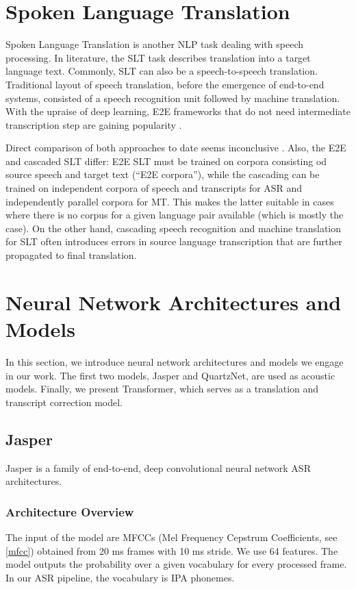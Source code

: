 \pagebreak
\section{Spoken Language Translation}
Spoken Language Translation is another NLP task dealing with speech processing. In literature, the SLT task describes translation into a target language text. Commonly, SLT can also be a speech-to-speech translation. Traditional layout of speech translation, before the emergence of end-to-end systems, consisted of a speech recognition unit followed by machine translation. With the upraise of deep learning, E2E frameworks that do not need intermediate transcription step are gaining popularity .

Direct comparison of both approaches to date seems inconclusive . Also, the E2E and cascaded SLT differ: E2E SLT must be trained on corpora consisting od source speech and target text (``E2E corpora''), while the cascading can be trained on independent corpora of speech and transcripts for ASR and independently parallel corpora for MT. This makes the latter suitable in cases where there is no corpus for a given language pair available (which is mostly the case). On the other hand, cascading speech recognition and machine translation for SLT often introduces errors in source language transcription that are further propagated to final translation.






\pagebreak
\section{Neural Network Architectures and Models}
In this section, we introduce neural network architectures and models we engage in our work. The first two models, Jasper and QuartzNet, are used as acoustic models. Finally, we present Transformer, which serves as a translation and transcript correction model.

\subsection{Jasper}

Jasper  is a family of end-to-end, deep convolutional neural network ASR architectures.

\subsubsection{Architecture Overview}
The input of the model are MFCCs (Mel Frequency Cepstrum Coefficients, see \cref{mfcc}) obtained from 20 ms frames with 10 ms stride. We use 64 features. The model outputs the probability over a given vocabulary for every processed frame. In our ASR pipeline, the vocabulary is IPA phonemes.

